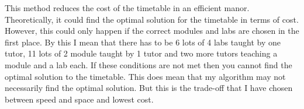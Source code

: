 \documentclass[conference]{IEEEtran}
\begin{document}
This method reduces the cost of the timetable in an efficient manor. Theoretically, it could find the optimal solution for the timetable in terms of cost. However, this could only happen if the correct modules and labs are chosen in the first place. By this I mean that there has to be 6 lots of 4 labs taught by one tutor, 11 lots of 2 module taught by 1 tutor and two more tutors teaching a module and a lab each. If these conditions are not met then you cannot find the optimal solution to the timetable. This does mean that my algorithm may not necessarily find the optimal solution. But this is the trade-off that  I have chosen between speed and space and lowest cost. 
\end{document}
